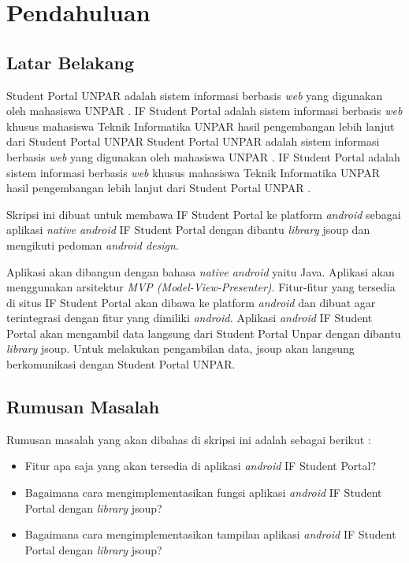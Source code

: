 \chapter{Pendahuluan}
\label{chap:intro}
   
\section{Latar Belakang}
\label{sec:label}

Student Portal UNPAR adalah sistem informasi berbasis \textit{web} yang digunakan oleh mahasiswa UNPAR \cite{studentportalunpar}. IF Student Portal adalah sistem informasi berbasis \textit{web} khusus mahasiswa Teknik Informatika UNPAR hasil pengembangan  lebih lanjut dari Student Portal UNPAR \cite{herfan:15:portal} Student Portal UNPAR adalah sistem informasi berbasis \textit{web} yang digunakan oleh mahasiswa UNPAR \cite{studentportalunpar}. IF Student Portal adalah sistem informasi berbasis \textit{web} khusus mahasiswa Teknik Informatika UNPAR hasil pengembangan  lebih lanjut dari Student Portal UNPAR \cite{herfan:15:portal} \cite{ifstudentportalunpar}. 

Skripsi ini dibuat untuk membawa IF Student Portal ke platform \textit{android} sebagai aplikasi \textit{native android} IF Student Portal dengan dibantu \textit{library} jsoup dan mengikuti pedoman \textit{android design}. 

 Aplikasi akan dibangun dengan bahasa \textit{native android} yaitu Java. Aplikasi akan menggunakan arsitektur \textit{MVP (Model-View-Presenter)}. Fitur-fitur yang tersedia di situs IF Student Portal akan dibawa ke platform \textit{android} dan dibuat agar terintegrasi dengan fitur yang dimiliki \textit{android.} Aplikasi \textit{android} IF Student Portal akan mengambil data langsung dari Student Portal Unpar dengan dibantu \textit{library} jsoup. Untuk melakukan pengambilan data, jsoup akan langsung berkomunikasi dengan Student Portal UNPAR.  

\section{Rumusan Masalah}
\label{sec:rumusan}
Rumusan masalah yang akan dibahas di skripsi ini adalah sebagai berikut :
\begin{itemize}
    \item Fitur apa saja yang akan tersedia di aplikasi \textit{android} IF Student Portal?
    \item Bagaimana cara mengimplementasikan fungsi aplikasi \textit{android} IF Student Portal dengan \textit{library} jsoup?
    \item Bagaimana cara mengimplementasikan tampilan aplikasi \textit{android} IF Student Portal dengan \textit{library} jsoup?
\end{itemize}

